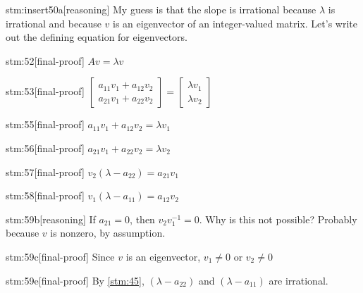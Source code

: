 \begin{stm}{stm:insert50a}[reasoning]
My guess is that the slope is irrational because $\lambda$ is irrational and because $v$ is an eigenvector of an integer-valued matrix. Let's write out the defining equation for eigenvectors.
\end{stm}

\begin{stm}{stm:52}[final-proof]
$A v = \lambda v$
\end{stm}

\begin{stm}{stm:53}[final-proof]
$\begin{bmatrix} a_{11}v_1 + a_{12}v_2 \\ a_{21}v_1 + a_{22}v_2 \end{bmatrix} = \begin{bmatrix} \lambda v_1 \\ \lambda v_2 \end{bmatrix}$
\end{stm}

\begin{stm}{stm:55}[final-proof]
$a_{11}v_1 + a_{12}v_2 = \lambda v_1$
\end{stm}

\begin{stm}{stm:56}[final-proof]
$a_{21}v_1 + a_{22}v_2 = \lambda v_2$
\end{stm}

\begin{stm}{stm:57}[final-proof]
$v_2(\lambda - a_{22}) = a_{21}v_1$
\end{stm}

\begin{stm}{stm:58}[final-proof]
$v_1(\lambda - a_{11}) = a_{12}v_2$
\end{stm}

\begin{stm}{stm:59b}[reasoning]
If $a_{21} = 0$, then $v_2 v_1^{-1} = 0$. Why is this not possible? Probably because $v$ is nonzero, by assumption.
\end{stm}

\begin{stm}{stm:59c}[final-proof]
Since $v$ is an eigenvector, $v_1 \ne 0$ or $v_2 \ne 0$
\end{stm}

\begin{stm}{stm:59e}[final-proof]
By \ref{stm:45}, $(\lambda - a_{22})$ and $(\lambda - a_{11})$ are irrational.
\end{stm}

